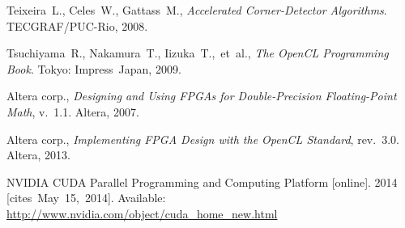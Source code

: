 {\begin{thebibliography}{99}
			Teixeira~L., Celes~W., Gattass~M.,
			\textit{Accelerated Corner-Detector Algorithms}.
			TECGRAF/PUC-Rio, 2008.
		
			Tsuchiyama~R., Nakamura~T., Iizuka~T.,~et~al.,
			\textit{The OpenCL Programming Book}. Tokyo: Impress~Japan, 2009.
		
			Altera corp., \textit{Designing and Using FPGAs for
				Double-Precision Floating-Point Math}, v.~1.1. Altera, 2007.
		
			Altera corp., \textit{Implementing FPGA Design with
				the OpenCL Standard}, rev.~3.0. Altera, 2013.
		
			NVIDIA CUDA Parallel Programming and Computing Platform [online].
			2014 [cites~May~15,~2014].
			Available: \url{http://www.nvidia.com/object/cuda_home_new.html}
	\end{thebibliography}
} %
